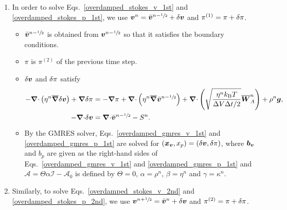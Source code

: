 \documentclass[
10pt
showpacs, showkeys,
amsmath,amssymb,
aps,
pre,
floatfix,
]{revtex4-1}
\newcommand{\divg}{{\V\nabla\cdot}}                       %
\newcommand{\paren}[1]{{(#1)}}                            %
\begin{document}
\begin{enumerate}

\item In order to solve Eqs.~\eqref{overdamped_stokes_v_1st} and \eqref{overdamped_stokes_p_1st}, we use $\boldsymbol{v}^n=\bar{\boldsymbol{v}}^{n-\sfrac{1}{2}}+\delta\boldsymbol{v}$ and $\pi^\paren{1}=\pi+\d{\pi}$.

\begin{itemize}
\item $\bar{\boldsymbol{v}}^{n-\sfrac{1}{2}}$ is obtained from $\boldsymbol{v}^{n-\sfrac{1}{2}}$ so that it satisfies the boundary conditions.
\item $\pi$ is $\pi^\paren{2}$ of the previous time step.
\item $\delta\boldsymbol{v}$ and $\delta\pi$ satisfy
\begin{align}
\label{overdamped_gmres_v_1st}
-\divg\left(\eta^n\overline{\grad}\d{\V{v}}\right) + \grad\d{\pi}
& = -\grad\pi 
 + \divg\left( \eta^n \overline{\grad}\bar{\V{v}}^{n-\myhalf} \right)
+ \divg\left( \sqrt{\frac{\eta^n k_\mathrm{B}T}{\D{V}\D{t}/2} } \overline{\V{W}}^n_A \right) + \rho^n\V{g},\\
\label{overdamped_gmres_p_1st}
-\divg\d{\V{v}} & = \divg\bar{\V{v}}^{n-\myhalf}-S^n.
\end{align}
\item By the GMRES solver, Eqs.~\eqref{overdamped_gmres_v_1st} and \eqref{overdamped_gmres_p_1st} are solved for $(\boldsymbol{x}_{\boldsymbol{v}},x_p)=(\delta\boldsymbol{v},\delta\pi)$, where $\boldsymbol{b}_{\boldsymbol{v}}$ and $b_p$ are given as the right-hand sides of Eqs.~\eqref{overdamped_gmres_v_1st} and \eqref{overdamped_gmres_p_1st} and $\mathcal{A}=\Theta\alpha\mathcal{I}-\mathcal{A}_0$ is defined by $\Theta=0$, $\alpha=\rho^n$, $\beta=\eta^n$ and $\gamma=\kappa^n$.
\end{itemize}

\item Similarly, to solve Eqs.~\eqref{overdamped_stokes_v_2nd} and \eqref{overdamped_stokes_p_2nd}, we use $\boldsymbol{v}^{n+\sfrac{1}{2}}=\bar{\boldsymbol{v}}^n+\delta\boldsymbol{v}$ and $\pi^\paren{2}=\pi+\d{\pi}$.


\end{enumerate}
\end{document}
